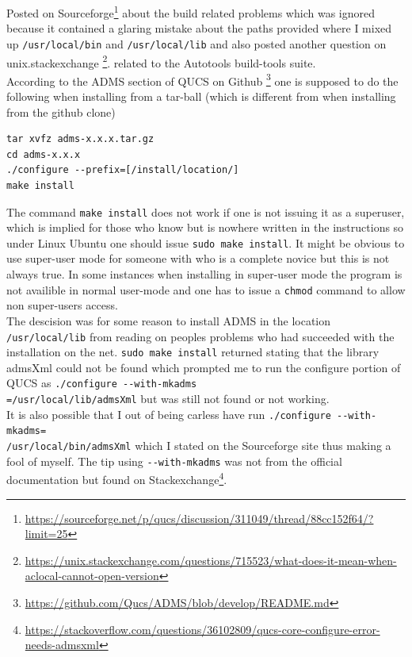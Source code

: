 \documentclass{article}
\begin{document}
\begin{multicols}{2}
Posted on Sourceforge\footnote{\url{https://sourceforge.net/p/qucs/discussion/311049/thread/88cc152f64/?limit=25}}
about the build related problems which was ignored because it contained a glaring mistake about the paths provided
where I mixed up \verb+/usr/local/bin+ and \verb+/usr/local/lib+ and also posted another question
on unix.stackexchange \footnote{\url{https://unix.stackexchange.com/questions/715523/what-does-it-mean-when-aclocal-cannot-open-version}}.
related to the Autotools build-tools suite.\\

According to the ADMS section of QUCS on Github \footnote{\url{https://github.com/Qucs/ADMS/blob/develop/README.md}} 
one is supposed to do the following when installing from a tar-ball (which is different from when installing from the github clone)
\begin{verbatim}
tar xvfz adms-x.x.x.tar.gz
cd adms-x.x.x
./configure --prefix=[/install/location/]
make install
\end{verbatim}

The command \verb+make install+ does not work if one is not issuing it as a superuser,
which is implied for those who know but is nowhere written in the instructions so under Linux Ubuntu
one should issue \verb+sudo make install+.
It might be obvious to use super-user mode for someone with who is a complete novice but this is not always true.
In some instances when installing in super-user mode the program is not availible in normal user-mode
and one has to issue a \verb+chmod+ command to allow non super-users access.\\

The descision was for some reason to  install ADMS in the location \verb+/usr/local/lib+ from reading on peoples problems who had
succeeded with the installation on the net. \verb+sudo make install+ returned stating that
the library admsXml could not be found which prompted me to run the configure portion of QUCS as
\verb+./configure --with-mkadms+\\
\verb+=/usr/local/lib/admsXml+ but was still not found or not working.\\
It is also possible that I out of being carless have run 
\verb+./configure --with-mkadms=+\\
\verb+/usr/local/bin/admsXml+ which I stated on the Sourceforge
site thus making a fool of myself.
 The tip using \verb+--with-mkadms+ was not from the official documentation but found
on Stackexchange\footnote{\url{https://stackoverflow.com/questions/36102809/qucs-core-configure-error-needs-admsxml}}.


\end{multicols}
\end{document}
